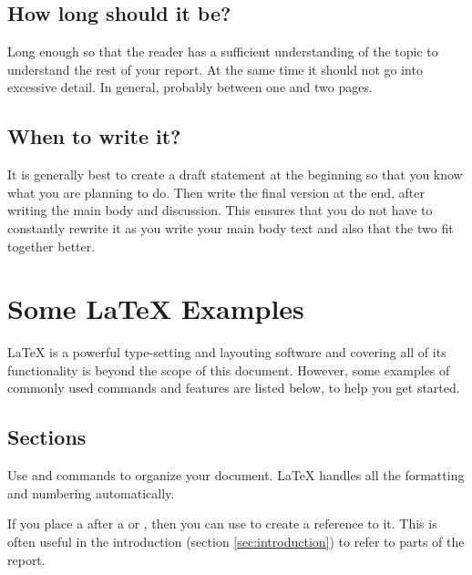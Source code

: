 \documentclass[a4paper,10pt]{ehu_webdev_report}
\begin{document}
\subsection{How long should it be?}

Long enough so that the reader has a sufficient understanding of the topic to understand the rest of your report. At the same time it should not go into excessive detail. In general, probably between one and two pages.

\subsection{When to write it?}

It is generally best to create a draft statement at the beginning so that you know what you are planning to do. Then write the final version at the end, after writing the main body and discussion. This ensures that you do not have to constantly rewrite it as you write your main body text and also that the two fit together better.
 
\newpage %

\section{Some \LaTeX{} Examples}
\label{sec:examples}

\LaTeX{} is a powerful type-setting and layouting software and covering all of its functionality is beyond the scope of this document. However, some examples of commonly used commands and features are listed below, to help you get started.

\subsection{Sections}

Use  and  commands to organize your document. \LaTeX{} handles all the formatting and numbering automatically.

If you place a  after a  or , then you can use  to create a reference to it. This is often useful in the introduction (section \ref{sec:introduction}) to refer to parts of the report.
\end{document}

